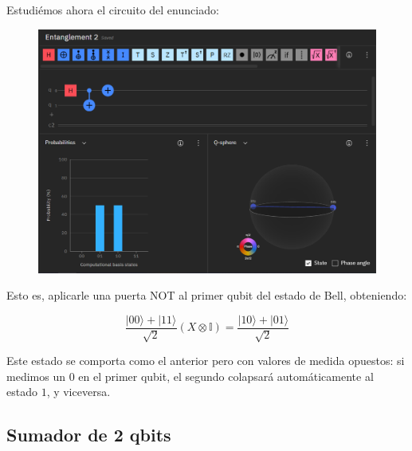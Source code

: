 \documentclass[11pt]{article}
\newcommand{\I}{\mathbb{I}}
\newcommand{\ra}{\rangle}
\theoremstyle{plain}
\newcounter{enunciado}
\begin{document}
Estudiémos ahora el circuito del enunciado:

\begin{figure}[H]
	\centering
	\includegraphics[scale=0.6]{figures/entanglement2.png}
\end{figure}

Esto es, aplicarle una puerta NOT al primer qubit del estado de Bell, obteniendo:

\[
	\frac{|00\ra + |11\ra}{\sqrt 2} (X \otimes \I) = \frac{|10\ra + |01\ra}{\sqrt 2}
\]

Este estado se comporta como el anterior pero con valores de medida opuestos: si medimos un $0$ en el primer qubit, el segundo colapsará automáticamente al estado $1$, y viceversa.


\subsection{Sumador de 2 qbits}
\label{sec-sumator}
\end{document}
